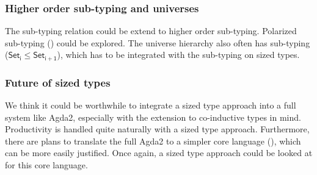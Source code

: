 \subsubsection{Higher order sub-typing and universes }
The sub-typing relation could be extend to higher order sub-typing.
Polarized sub-typing (\cite{steffen:phd}) could be explored.
The universe hierarchy also often has sub-typing ($ \mathsf{Set_i} \leq \mathsf{Set_{i+1}}$), which has to be integrated with the sub-typing on sized types.
\subsubsection{Future of sized types}
We think it could be worthwhile to integrate a sized type approach into a full system like Agda2, especially with the extension to co-inductive types in mind. Productivity is handled quite naturally with a sized type approach. 
Furthermore, there are plans to translate the full Agda2 to a simpler core language (\cite{mini-tt}), which can be more easily justified. Once again, a sized type approach could be looked at for this core language.

